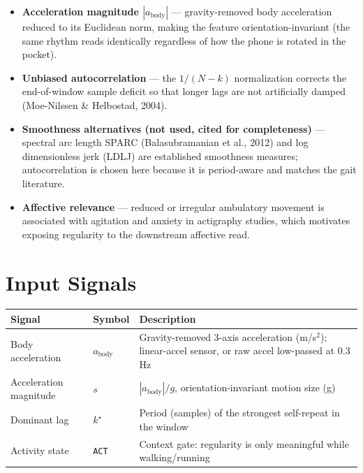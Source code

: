 \begin{itemize}[leftmargin=1.4em]
  \item \textbf{Acceleration magnitude $|a_\text{body}|$} --- gravity-removed body
  acceleration reduced to its Euclidean norm, making the feature orientation-invariant
  (the same rhythm reads identically regardless of how the phone is rotated in the pocket).
  \item \textbf{Unbiased autocorrelation} --- the $1/(N-k)$ normalization corrects the
  end-of-window sample deficit so that longer lags are not artificially damped
  (Moe-Nilssen \& Helbostad, 2004).
  \item \textbf{Smoothness alternatives (not used, cited for completeness)} --- spectral
  arc length SPARC (Balasubramanian et al., 2012) and log dimensionless jerk (LDLJ) are
  established smoothness measures; autocorrelation is chosen here because it is
  period-aware and matches the gait literature.
  \item \textbf{Affective relevance} --- reduced or irregular ambulatory movement is
  associated with agitation and anxiety in actigraphy studies, which motivates exposing
  regularity to the downstream affective read.
\end{itemize}

\section{Input Signals}

\begin{center}
\begin{tabular}{@{}l l >{\raggedright\arraybackslash}p{7.4cm}@{}}
\toprule
\textbf{Signal} & \textbf{Symbol} & \textbf{Description} \\
\midrule
Body acceleration      & $a_\text{body}$ & Gravity-removed 3-axis acceleration (m/s$^2$);
                                            linear-accel sensor, or raw accel low-passed at 0.3\,Hz \\
Acceleration magnitude & $s$             & $|a_\text{body}|/g$, orientation-invariant motion size (g) \\
Dominant lag           & $k^\star$       & Period (samples) of the strongest self-repeat in the window \\
Activity state         & \texttt{ACT}    & Context gate: regularity is only meaningful while walking/running \\
\bottomrule
\end{tabular}
\end{center}

